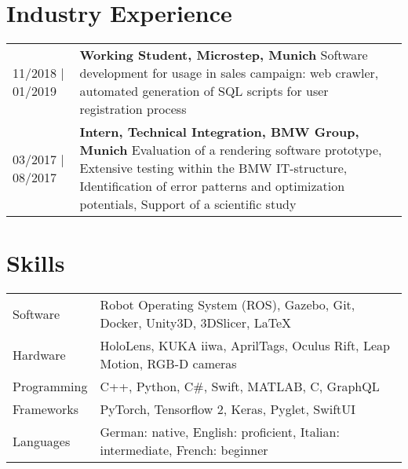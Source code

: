 \documentclass{article}
\begin{document}
\section*{Industry Experience}
\begin{tabularx}{\textwidth}{@{}lX}
11/2018 | 01/2019 &  \textbf{Working Student, Microstep, Munich} \newline
                  	 Software development for usage in sales campaign: web crawler, automated generation of SQL scripts for user registration process \\
03/2017 | 08/2017 &  \textbf{Intern, Technical Integration, BMW Group, Munich} \newline
                  	 Evaluation of a rendering software prototype, Extensive testing within the BMW IT-structure, Identification of error patterns and optimization potentials, Support of a scientific study \\
\end{tabularx}

\setlength{\extrarowheight}{3pt}

\section*{Skills}
\begin{tabularx}{\textwidth}{@{}lX}

Software &  Robot Operating System (ROS), Gazebo, Git, Docker, Unity3D, 3DSlicer, \LaTeX \\
Hardware & HoloLens, KUKA iiwa, AprilTags, Oculus Rift, Leap Motion, RGB-D cameras \\
Programming &C++, Python, C\#, Swift, MATLAB, C, GraphQL  \\
Frameworks & PyTorch, Tensorflow 2, Keras, Pyglet, SwiftUI \\
Languages & German: native, English: proficient, Italian: intermediate, French: beginner 
\end{tabularx}
\end{document}
